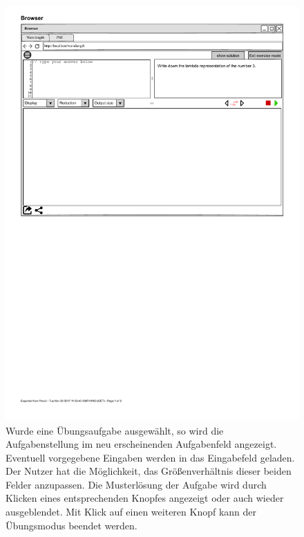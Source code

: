 \documentclass[parskip=full,11pt,twoside]{scrartcl}
\begin{document}
\begin{figure}[H]
	\centering
	\includegraphics[width=\textwidth]{img/exerciseMode}
	\caption{\label{fig:exerciseMode}Wurde eine Übungsaufgabe ausgewählt, so wird die Aufgabenstellung im neu erscheinenden Aufgabenfeld angezeigt. Eventuell vorgegebene Eingaben werden in das Eingabefeld geladen. Der Nutzer hat die Möglichkeit, das Größenverhältnis dieser beiden Felder anzupassen. Die Musterlösung der Aufgabe wird durch Klicken eines entsprechenden Knopfes angezeigt oder auch wieder ausgeblendet. Mit Klick auf einen weiteren Knopf kann der Übungsmodus beendet werden.}
\end{figure}
\end{document}
